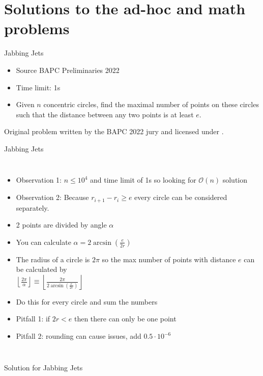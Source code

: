 \documentclass[11pt,pdf, aspectratio=169]{beamer}
\begin{document}
  \section{Solutions to the ad-hoc and math problems}
  \begin{frame}{Jabbing Jets}
    \begin{itemize}
      \item Source BAPC Preliminaries 2022
      \item Time limit: 1s
      \item Given $n$ concentric circles, find the maximal number of points on these circles such that the distance between any two points is at least $e$.
    \end{itemize}
    Original problem written by the BAPC 2022 jury and licensed under \doclicenseLongNameRef.

    \doclicenseImage

  \end{frame}
  \begin{frame}{Jabbing Jets}
    \begin{columns}
      \begin{itemize}
        \item Observation 1: $n \leq 10^4$ and time limit of 1s so looking for $\mathcal{O}(n)$ solution
        \item Observation 2: Because $r_{i+1}-r_i \geq e$ every circle can be considered separately.
        \item 2 points are divided by angle $\alpha$
        \item You can calculate $\alpha = 2 \arcsin{}(\frac{e}{2r})$
        \item The radius of a circle is $2\pi$ so the max number of points with distance $e$ can be calculated by\\
        $\left\lfloor\frac{2\pi}{\alpha}\right\rfloor \equiv \left\lfloor \frac{2\pi}{2 \arcsin{}(\frac{e}{2r})}\right\rfloor$
        \item Do this for every circle and sum the numbers
        \item Pitfall 1: if $2r < e$ then there can only be one point
        \item Pitfall 2: rounding can cause issues, add $0.5\cdot 10^{-6}$
      \end{itemize}
      
    \end{columns}
  \end{frame}
  \begin{frame}[containsverbatim]{Solution for Jabbing Jets}
    \inputminted{python}{code/session-1/python/dapc-j.py}
  \end{frame}
\end{document}
